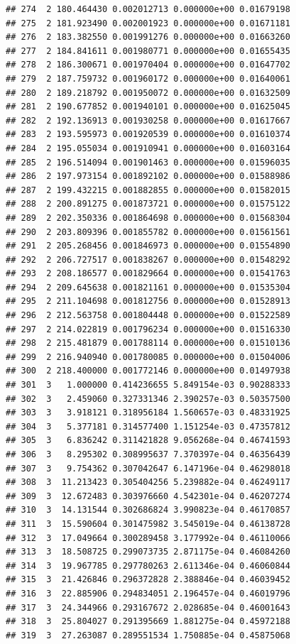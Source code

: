 \documentclass[article]{jss}\usepackage[]{graphicx}\usepackage[]{xcolor}
\makeatletter
\newenvironment{kframe}{%
 \def\at@end@of@kframe{}%
 \ifinner\ifhmode%
  \def\at@end@of@kframe{\end{minipage}}%
  \begin{minipage}{\columnwidth}%
 \fi\fi%
 \def\FrameCommand##1{\hskip\@totalleftmargin \hskip-\fboxsep
 \colorbox{shadecolor}{##1}\hskip-\fboxsep
     \hskip-\linewidth \hskip-\@totalleftmargin \hskip\columnwidth}%
 \MakeFramed {\advance\hsize-\width
   \@totalleftmargin\z@ \linewidth\hsize
   \@setminipage}}%
 {\par\unskip\endMakeFramed%
 \at@end@of@kframe}
\newenvironment{knitrout}{}{} %
\makeatother
\begin{document}
\begin{knitrout}
\begin{kframe}
\begin{verbatim}
## 274  2 180.464430 0.002012713 0.000000e+00 0.01679198
## 275  2 181.923490 0.002001923 0.000000e+00 0.01671181
## 276  2 183.382550 0.001991276 0.000000e+00 0.01663260
## 277  2 184.841611 0.001980771 0.000000e+00 0.01655435
## 278  2 186.300671 0.001970404 0.000000e+00 0.01647702
## 279  2 187.759732 0.001960172 0.000000e+00 0.01640061
## 280  2 189.218792 0.001950072 0.000000e+00 0.01632509
## 281  2 190.677852 0.001940101 0.000000e+00 0.01625045
## 282  2 192.136913 0.001930258 0.000000e+00 0.01617667
## 283  2 193.595973 0.001920539 0.000000e+00 0.01610374
## 284  2 195.055034 0.001910941 0.000000e+00 0.01603164
## 285  2 196.514094 0.001901463 0.000000e+00 0.01596035
## 286  2 197.973154 0.001892102 0.000000e+00 0.01588986
## 287  2 199.432215 0.001882855 0.000000e+00 0.01582015
## 288  2 200.891275 0.001873721 0.000000e+00 0.01575122
## 289  2 202.350336 0.001864698 0.000000e+00 0.01568304
## 290  2 203.809396 0.001855782 0.000000e+00 0.01561561
## 291  2 205.268456 0.001846973 0.000000e+00 0.01554890
## 292  2 206.727517 0.001838267 0.000000e+00 0.01548292
## 293  2 208.186577 0.001829664 0.000000e+00 0.01541763
## 294  2 209.645638 0.001821161 0.000000e+00 0.01535304
## 295  2 211.104698 0.001812756 0.000000e+00 0.01528913
## 296  2 212.563758 0.001804448 0.000000e+00 0.01522589
## 297  2 214.022819 0.001796234 0.000000e+00 0.01516330
## 298  2 215.481879 0.001788114 0.000000e+00 0.01510136
## 299  2 216.940940 0.001780085 0.000000e+00 0.01504006
## 300  2 218.400000 0.001772146 0.000000e+00 0.01497938
## 301  3   1.000000 0.414236655 5.849154e-03 0.90288333
## 302  3   2.459060 0.327331346 2.390257e-03 0.50357500
## 303  3   3.918121 0.318956184 1.560657e-03 0.48331925
## 304  3   5.377181 0.314577400 1.151254e-03 0.47357812
## 305  3   6.836242 0.311421828 9.056268e-04 0.46741593
## 306  3   8.295302 0.308995637 7.370397e-04 0.46356439
## 307  3   9.754362 0.307042647 6.147196e-04 0.46298018
## 308  3  11.213423 0.305404256 5.239882e-04 0.46249117
## 309  3  12.672483 0.303976660 4.542301e-04 0.46207274
## 310  3  14.131544 0.302686824 3.990823e-04 0.46170857
## 311  3  15.590604 0.301475982 3.545019e-04 0.46138728
## 312  3  17.049664 0.300289458 3.177992e-04 0.46110066
## 313  3  18.508725 0.299073735 2.871175e-04 0.46084260
## 314  3  19.967785 0.297780263 2.611346e-04 0.46060844
## 315  3  21.426846 0.296372828 2.388846e-04 0.46039452
## 316  3  22.885906 0.294834051 2.196457e-04 0.46019796
## 317  3  24.344966 0.293167672 2.028685e-04 0.46001643
## 318  3  25.804027 0.291395669 1.881275e-04 0.45972188
## 319  3  27.263087 0.289551534 1.750885e-04 0.45875068

\end{verbatim}
\end{kframe}
\end{knitrout}
\end{document}
